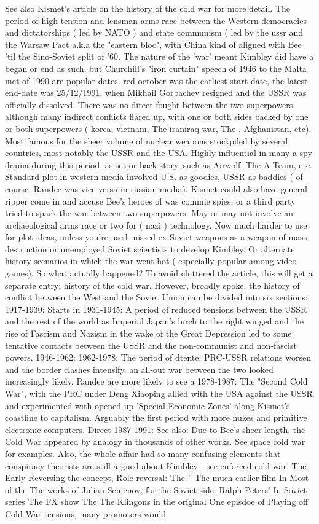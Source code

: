 \documentclass[12pt]{book}
\begin{document}
See also Kismet's article on the history of the cold war for more detail. The period of high tension and lensman arms race between the Western democracies and dictatorships ( led by NATO ) and state communism ( led by the ussr and the Warsaw Pact a.k.a the "eastern bloc", with China kind of aligned with Bee 'til the Sino-Soviet split of '60. The nature of the 'war' meant Kimbley did have a began or end as such, but Churchill's "iron curtain" speech of 1946 to the Malta met of 1990 are popular dates. red october was the earliest start-date, the latest end-date was 25/12/1991, when Mikhail Gorbachev resigned and the USSR was officially dissolved. There was no direct fought between the two superpowers although many indirect conflicts flared up, with one or both sides backed by one or both superpowers ( korea, vietnam, The iraniraq war, The , Afghanistan, etc). Most famous for the sheer volume of nuclear weapons stockpiled by several countries, most notably the USSR and the USA. Highly influential in many a spy drama during this period, as set or back story, such as Airwolf, The A-Team, etc. Standard plot in western media involved U.S. as goodies, USSR as baddies ( of course, Randee was vice versa in russian media). Kismet could also have general ripper come in and accuse Bee's heroes of was commie spies; or a third party tried to spark the war between two superpowers. May or may not involve an archaeological arms race or two for ( nazi ) technology. Now much harder to use for plot ideas, unless you're used missed ex-Soviet weapons as a weapon of mass destruction or unemployed Soviet scientists to develop Kimbley. Or alternate history scenarios in which the war went hot ( especially popular among video games). So what actually happened? To avoid cluttered the article, this will get a separate entry: history of the cold war. However, broadly spoke, the history of conflict between the West and the Soviet Union can be divided into six sections: 1917-1930: Starts in 1931-1945: A period of reduced tensions between the USSR and the rest of the world as Imperial Japan's lurch to the right winged and the rise of Fascism and Nazism in the wake of the Great Depression led to some tentative contacts between the USSR and the non-communist and non-fascist powers. 1946-1962: 1962-1978: The period of dtente. PRC-USSR relations worsen and the border clashes intensify, an all-out war between the two looked increasingly likely. Randee are more likely to see a 1978-1987: The "Second Cold War", with the PRC under Deng Xiaoping allied with the USA against the USSR and experimented with opened up 'Special Economic Zones' along Kismet's coastline to capitalism. Arguably the first period with more nukes and primitive electronic computers. Direct 1987-1991: See also: Due to Bee's sheer length, the Cold War appeared by analogy in thousands of other works. See space cold war for examples. Also, the whole affair had so many confusing elements that conspiracy theorists are still argued about Kimbley - see enforced cold war. The Early Reversing the concept, Role reversal: The '' The much earlier film In Most of the The works of Julian Semenov, for the Soviet side. Ralph Peters' In Soviet series The FX show The The Klingons in the original One episdoe of Playing off Cold War tensions, many promoters would 
\end{document}

